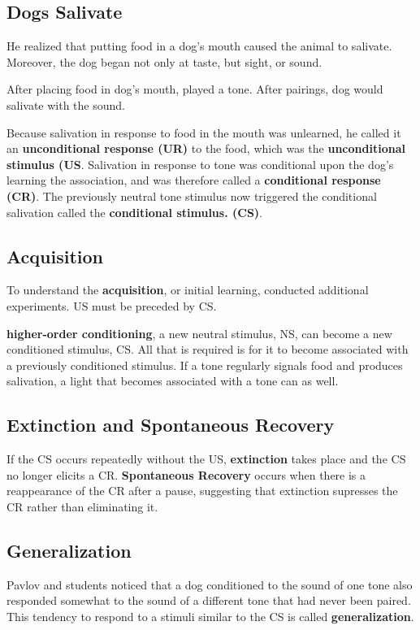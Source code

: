 \documentclass[12pt]{article}
\begin{document}
\subsection*{Dogs Salivate}
He realized that putting food in a dog's mouth caused the animal to salivate. Moreover, the dog began not only at taste, but sight, or sound. 

After placing food in dog's mouth, played a tone. After pairings, dog would salivate with the sound. 

Because salivation in response to food in the mouth was unlearned, he called it an \textbf{unconditional response (UR)} to the food, which was the \textbf{unconditional stimulus (US}. Salivation in response to tone was conditional upon the dog's learning the association, and was therefore called a \textbf{conditional response (CR)}. The previously neutral tone stimulus now triggered the conditional salivation called the \textbf{conditional stimulus. (CS)}. 

\subsection*{Acquisition}
To understand the \textbf{acquisition}, or initial learning, conducted additional experiments. US must be preceded by CS. 

\textbf{higher-order conditioning}, a new neutral stimulus, NS, can become a new conditioned stimulus, CS. All that is required is for it to become associated with a previously conditioned stimulus. If a tone regularly signals food and produces salivation, a light that becomes associated with a tone can as well.

\subsection*{Extinction and Spontaneous Recovery}
If the CS occurs repeatedly without the US, \textbf{extinction} takes place and the CS no longer elicits a CR. \textbf{Spontaneous Recovery} occurs when there is a reappearance of the CR after a pause, suggesting that extinction supresses the CR rather than eliminating it.

\subsection*{Generalization}
Pavlov and students noticed that a dog conditioned to the sound of one tone also responded somewhat to the sound of a different tone that had never been paired. This tendency to respond to a stimuli similar to the CS is called \textbf{generalization}.
\end{document}
